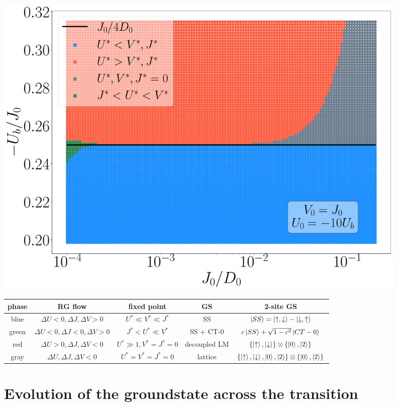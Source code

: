 \documentclass[10pt]{report}
\numberwithin{equation}{section}
\begin{document}
\begin{center}
	\includegraphics[width=0.9\textwidth]{../figures/phase-map-MIT.pdf}
\end{center}

\begin{center}
\begin{tabular}{|c|c|c|c|c|}
\hline
phase & RG flow & fixed point & GS & 2-site GS \\ 
\hline
blue & \(\Delta U <0, \Delta J,\Delta V>0\) & \(U^* \ll V^* \ll J^*\) & SS & \(\ket{SS}=\ket{\uparrow,\downarrow} - \ket{\downarrow, \uparrow}\)  \\ 
green &  \(\Delta U < 0, \Delta J < 0,\Delta V>0\) & \(J^* < U^* \ll V^*\) & SS + CT-0 & \(c\ket{SS} + \sqrt{1-c^2}\ket{CT-0}\)  \\  
red &  \(\Delta U > 0, \Delta J,\Delta V<0\) & \(U^* \gg 1,  V^* = J^* = 0\) & decoupled LM & \(\left\{\ket{\uparrow}, \ket{\downarrow} \right\} \otimes \left\{\ket{0}, \ket{2}\right\} \) \\
gray &  \(\Delta U, \Delta J,\Delta V < 0\) & \(U^* = V^* = J^* = 0\) & lattice & \(\left\{\ket{\uparrow}, \ket{\downarrow}, \ket{0}, \ket{2} \right\} \otimes \left\{\ket{0}, \ket{2}\right\}\) \\
\hline
\end{tabular}
\end{center}

\section{Evolution of the groundstate across the transition}
\end{document}
